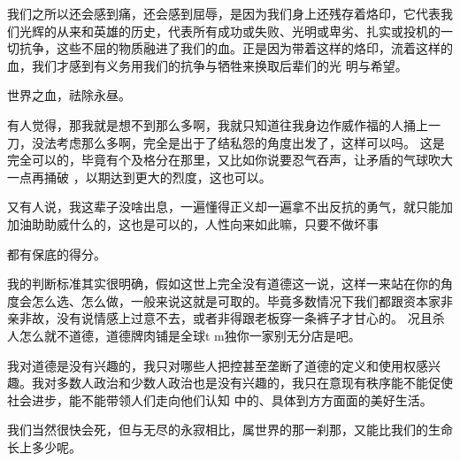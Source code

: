 \documentclass{article}
\begin{document}
我们之所以还会感到痛，还会感到屈辱，是因为我们身上还残存着烙印，它代表我们光辉的从来和英雄的历史，代表所有成功或失败、光明或卑劣、扎实或投机的一切抗争，这些不屈的物质融进了我们的血。正是因为带着这样的烙印，流着这样的血，我们才感到有义务用我们的抗争与牺牲来换取后辈们的光
明与希望。 


世界之血，祛除永昼。 

有人觉得，那我就是想不到那么多啊，我就只知道往我身边作威作福的人捅上一刀，没法考虑那么多啊，完全是出于了结私怨的角度出发了，这样可以吗。
这是完全可以的，毕竟有个及格分在那里，又比如你说要忍气吞声，让矛盾的气球吹大一点再捅破
，以期达到更大的烈度，这也可以。 

又有人说，我这辈子没啥出息，一遍懂得正义却一遍拿不出反抗的勇气，就只能加加油助助威什么的，这也是可以的，人性向来如此嘛，只要不做坏事
\newpage

都有保底的得分。 

我的判断标准其实很明确，假如这世上完全没有道德这一说，这样一来站在你的角度会怎么选、怎么做，一般来说这就是可取的。毕竟多数情况下我们都跟资本家非亲非故，没有说情感上过意不去，或者非得跟老板穿一条裤子才甘心的。
况且杀人怎么就不道德，道德牌肉铺是全球t
m独你一家别无分店是吧。 

我对道德是没有兴趣的，我只对哪些人把控甚至垄断了道德的定义和使用权感兴趣。我对多数人政治和少数人政治也是没有兴趣的，我只在意现有秩序能不能促使社会进步，能不能带领人们走向他们认知
中的、具体到方方面面的美好生活。 

我们当然很快会死，但与无尽的永寂相比，属世界的那一刹那，又能比我们的生命长上多少呢。
\end{document}
